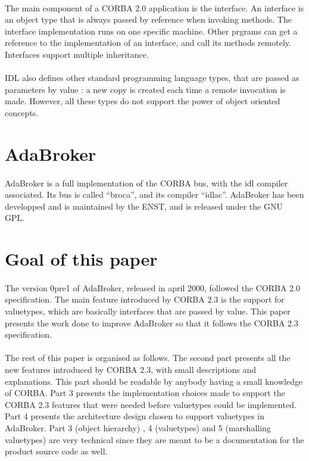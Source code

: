 \paragraph{}The main component of a CORBA 2.0 application is the
interface. An interface is an object type that is always passed by
reference when invoking methods. The interface implementation runs on
one specific machine. Other prgrams can get a reference to the
implementation of an interface, and call its methods remotely.
Interfaces support multiple inheritance.

\paragraph{}IDL also defines other standard programming language
types, that are passed as parameters by value : a new copy is created
each time a remote invocation is made. However, all these types do not
support the power of object oriented concepts.


\section{AdaBroker}

\paragraph{}AdaBroker is a full implementation of the CORBA bus, with the idl
compiler associated. Its bus is called ``broca'', and its compiler
``idlac''. AdaBroker has been developped and is maintained by the
ENST, and is released under the GNU GPL.

\section{Goal of this paper}
\paragraph{}The version 0pre1 of AdaBroker, released in april 2000,
followed the CORBA 2.0 specification. The main feature introduced by
CORBA 2.3 is the support for valuetypes, which are basically
interfaces that are passed by value. This paper presents the work done
to improve AdaBroker so that it follows the CORBA 2.3 specification. 

\paragraph{} The rest of this paper is organised as follows. The
second part presents all the new features introduced by CORBA 2.3,
with small descriptions and explanations. This part should be readable
by anybody having a small knowledge of CORBA. Part 3 presents the
implementation choices made to support the CORBA 2.3 features that were needed before
valuetypes could be implemented. Part 4 presents the architecture design chosen to
support valuetypes in AdaBroker. Part 3 (object hierarchy) , 4
(valuetypes) and 5 (marshalling valuetypes) are very technical since
they are meant to be a documentation for the product source code as well.

